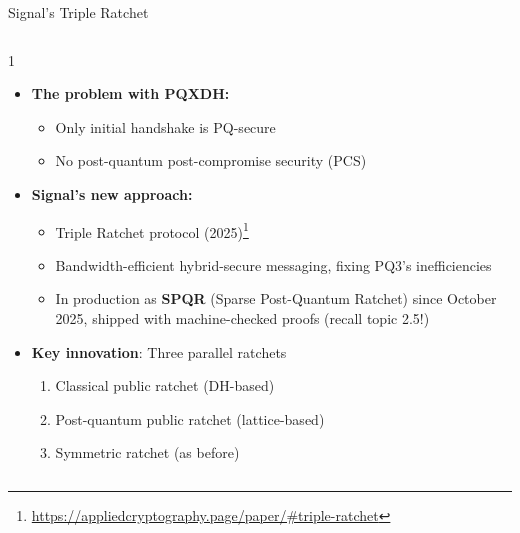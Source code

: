 \ifdefined\PRESENTATION\else\PassOptionsToClass{handout}{beamer}\fi\documentclass[aspectratio=169, lualatex]{beamer}
\begin{document}
\begin{frame}{Signal's Triple Ratchet}
	\begin{columns}[c]
		\begin{column}{1\textwidth}
			\begin{itemize}
				\item \textbf{The problem with PQXDH:}
				      \begin{itemize}
					      \item Only initial handshake is PQ-secure
					      \item No post-quantum post-compromise security (PCS)
				      \end{itemize}
				\item \textbf{Signal's new approach:}
				      \begin{itemize}
					      \item Triple Ratchet protocol (2025)\footnote{\url{https://appliedcryptography.page/paper/\#triple-ratchet}}
					      \item Bandwidth-efficient hybrid-secure messaging, fixing PQ3's inefficiencies
					      \item In production as \textbf{SPQR} (Sparse Post-Quantum Ratchet) since October 2025, shipped with machine-checked proofs (recall topic 2.5!)
				      \end{itemize}
				\item \textbf{Key innovation}: Three parallel ratchets
				      \begin{enumerate}
					      \item Classical public ratchet (DH-based)
					      \item Post-quantum public ratchet (lattice-based)
					      \item Symmetric ratchet (as before)
				      \end{enumerate}
			\end{itemize}
		\end{column}
	\end{columns}
\end{frame}
\end{document}
